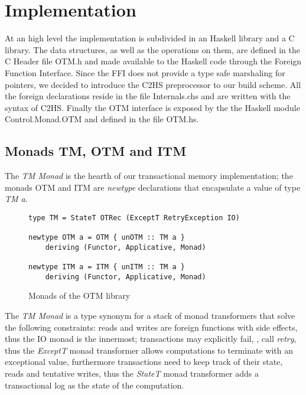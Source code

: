
\chapter{Implementation}

At an high level the implementation is subdivided in an Haskell library and a C library.
The data structures, as well as the operations on them, are defined in the C Header file OTM.h and made available to the Haskell code through the Foreign Function Interface.
Since the FFI does not provide a type safe marshaling for pointers, we decided to introduce the C2HS preprocessor to our build scheme.
All the foreign declarations reside in the file Internals.chs and are written with the syntax of C2HS.\cite{Chakravarty2000}
Finally the OTM interface is exposed by the the Haskell module Control.Monad.OTM and defined in the file OTM.hs.

\section{Monads TM, OTM and ITM}

The \emph{TM Monad} is the hearth of our transactional memory implementation;
the monads OTM and ITM are \emph{newtype} declarations that encapsulate a value of type \emph{TM a}.

\begin{figure}
\begin{Verbatim}
type TM = StateT OTRec (ExceptT RetryException IO)

newtype OTM a = OTM { unOTM :: TM a }
    deriving (Functor, Applicative, Monad)

newtype ITM a = ITM { unITM :: TM a }
    deriving (Functor, Applicative, Monad)
\end{Verbatim}
\caption{Monads of the OTM library}
\end{figure}

The \emph{TM Monad} is a type synonym for a stack of monad transformers that solve the following constraints:
reads and writes are foreign functions with side effects, thus the IO monad is the innermost;
transactions may explicitly fail, \ie, call \emph{retry}, thus the \emph{ExceptT} monad transformer allows computations to terminate with an exceptional value,
furthermore transactions need to keep track of their state, reads and tentative writes, thus the \emph{StateT} monad transformer adds a transactional log as the state of the computation.

